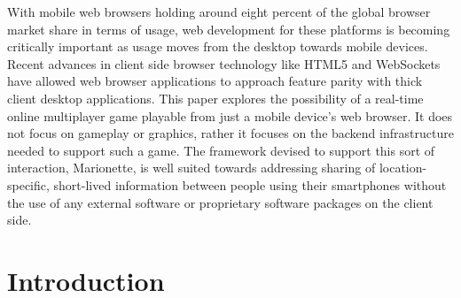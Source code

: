 \documentclass[12pt]{report}	%
\theoremstyle{definition}
\theoremstyle{remark}
\begin{document}
%
\utabstract
{}%
\indent
With mobile web browsers holding around eight percent of the global
browser market share in terms of usage, web development for these
platforms is becoming critically important as usage moves from the
desktop towards mobile devices. Recent advances in client side browser
technology like HTML5 and WebSockets have allowed web browser
applications to approach feature parity with thick client desktop
applications. This paper explores the possibility of a real-time online
multiplayer game playable from just a mobile device's web browser. It
does not focus on gameplay or graphics, rather it focuses on the backend
infrastructure needed to support such a game. The framework devised to
support this sort of interaction, Marionette, is well suited towards
addressing sharing of location-specific, short-lived information between
people using their smartphones without the use of any external software
or proprietary software packages on the client side.



\tableofcontents   %

\listoftables      %
\listoffigures     %

%
%

\chapter{Introduction}
\end{document}
